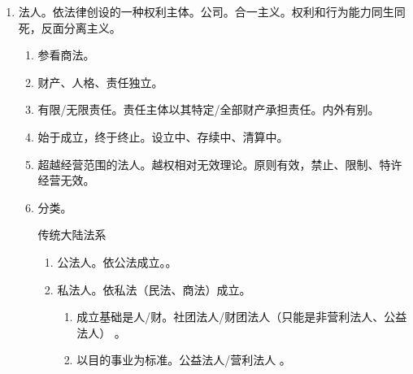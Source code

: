 \begin{enumerate}
\begin{enumerate}
\begin{enumerate}
                        \begin{enumerate}
                          \item 2 个独立的程序、没啥关系、没有顺序要求。
                          \item 一方申请宣告失踪，一方申请宣告死亡，如果满足宣告死亡条件 \yjt 宣告死亡。
                        \end{enumerate}
                \end{enumerate}
        \end{enumerate}
  \item 法人。依法律创设的一种权利主体。公司。合一主义。权利和行为能力同生同死，反面分离主义。
        \begin{enumerate}
          \item 参看商法。
          \item 财产、人格、责任独立。
          \item 有限/无限责任。\yi 责任主体以其特定/全部财产承担责任。\er 内外有别。
          \item 始于成立，终于终止。设立中、存续中、清算中。
          \item 超越经营范围的法人。越权相对无效理论。原则有效，禁止、限制、特许经营无效。
          \item 分类。
                \begin{kk}{传统大陆法系}
                  \begin{enumerate}
                    \item 公法人。依公法成立。。
                    \item 私法人。依私法（民法、商法）成立。
                          \begin{enumerate}
                            \item 成立基础是人/财。社团法人/财团法人（只能是非营利法人、公益法人） \yjt {}。
                            \item 以目的事业为标准。公益法人/营利法人 \yjt {}。
                          \end{enumerate}
                  \end{enumerate}
                \end{kk}


\end{enumerate}
\end{enumerate}
